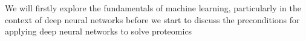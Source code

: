 We will firstly explore the fundamentals of machine learning, particularly in the context of deep neural networks before we start to discuss the preconditions for applying deep neural networks to solve proteomics